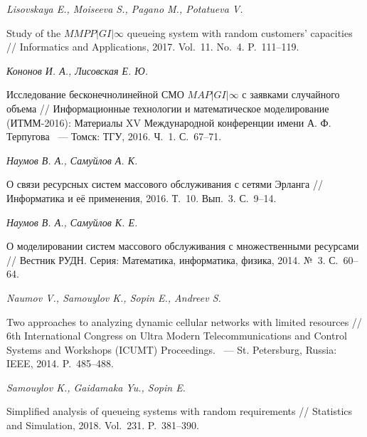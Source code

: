 \documentclass[a4paper,12pt]{article}
\begin{document}
\begin{enumerate}


\textit{Lisovskaya E., Moiseeva S., Pagano M., Potatueva V.}

Study of the $MMPP|GI|\infty$ queueing system with random customers' capacities // {Informatics and Applications}, 2017. Vol.~11. No.~4. P.~111--119.





\textit{Кононов И. А., Лисовская Е. Ю.}

Исследование бесконечнолинейной СМО $MAP|GI|\infty$ с заявками случайного объема // {Информационные технологии и математическое моделирование (ИТММ-2016): Материалы XV Международной конференции имени А. Ф. Терпугова} ~--- Томск: ТГУ, 2016. Ч.~1. С.~67--71.





\textit{Наумов В. А., Самуйлов А. К.}

О связи ресурсных систем массового обслуживания с сетями Эрланга // {Информатика и её применения}, 2016. Т.~10. Вып.~3. С.~9--14.





\textit{Наумов В. А., Самуйлов К. Е.}

О моделировании систем массового обслуживания с множественными ресурсами // {Вестник РУДН. Серия: Математика, информатика, физика}, 2014. №~3. С.~60--64.





\textit{Naumov V., Samouylov K., Sopin E., Andreev S.}

Two approaches to analyzing dynamic cellular networks with limited resources // {6th International Congress on Ultra Modern Telecommunications and Control Systems and Workshops (ICUMT) Proceedings}. ~--- St. Petersburg, Russia: IEEE, 2014. P.~485--488.





\textit{Samouylov K., Gaidamaka Yu., Sopin E.}

Simplified analysis of queueing systems with random requirements // {Statistics and Simulation}, 2018. Vol.~231. P.~381--390.




\end{enumerate}
\end{document}
